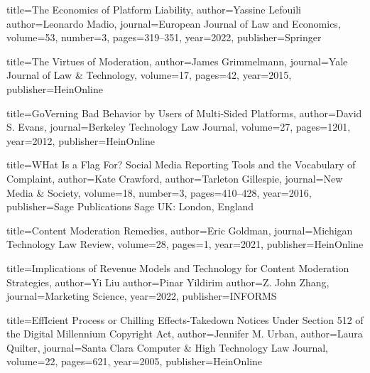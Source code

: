 {
  title={The Economics of Platform Liability},
  author={Yassine Lefouili}
  author={Leonardo Madio},
  journal={European Journal of Law and Economics},
  volume={53},
  number={3},
  pages={319--351},
  year={2022},
  publisher={Springer}
}




{
  title={The Virtues of Moderation},
  author={James Grimmelmann},
  journal={Yale Journal of Law \& Technology},
  volume={17},
  pages={42},
  year={2015},
  publisher={HeinOnline}
}


{
  title={GoVerning Bad Behavior by Users of Multi-Sided Platforms},
  author={David S. Evans},
  journal={Berkeley Technology Law Journal},
  volume={27},
  pages={1201},
  year={2012},
  publisher={HeinOnline}
}

{
  title={WHat Is a Flag For? Social Media Reporting Tools and the Vocabulary of Complaint},
  author={Kate Crawford},
  author={Tarleton Gillespie},
  journal={New Media \& Society},
  volume={18},
  number={3},
  pages={410--428},
  year={2016},
  publisher={Sage Publications Sage UK: London, England}
}

{
  title={Content Moderation Remedies},
  author={Eric Goldman},
  journal={Michigan Technology Law Review},
  volume={28},
  pages={1},
  year={2021},
  publisher={HeinOnline}
}


{
  title={Implications of Revenue Models and Technology for Content Moderation Strategies},
  author={Yi Liu}
  author={Pinar Yildirim}
  author={Z. John Zhang},
  journal={Marketing Science},
  year={2022},
  publisher={INFORMS}
}


{
  title={EffIcient Process or Chilling Effects-Takedown Notices Under Section 512 of the Digital Millennium Copyright Act},
  author={Jennifer M. Urban},
  author={Laura Quilter},
  journal={Santa Clara Computer \& High Technology Law Journal},
  volume={22},
  pages={621},
  year={2005},
  publisher={HeinOnline}
}



